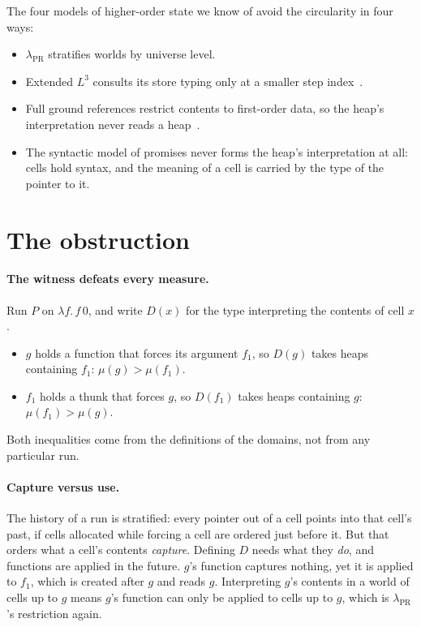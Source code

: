 \documentclass[11pt]{article}
\theoremstyle{remark}
\newcommand{\lpr}{\lambda_{\mathrm{PR}}}
\newcommand{\slam}[1]{\lambda #1.\,}
\begin{document}
The four models of higher-order state we know of avoid the circularity in
four ways:
\begin{itemize}
  \item $\lpr$ stratifies worlds by universe level.
  \item Extended $L^3$ consults its store typing only at a smaller
    step index~\cite{ahmed2007}.
  \item Full ground references restrict contents to first-order data, so
    the heap's interpretation never reads a heap~\cite{kammar2017}.
  \item The syntactic model of promises never forms the heap's
    interpretation at all: cells hold syntax, and the meaning of a cell is
    carried by the type of the pointer to it.
\end{itemize}

\section{The obstruction}
\label{sec:obstruction}

\paragraph{The witness defeats every measure.}
Run $P$ on $\slam{f} f\,0$, and write $D(x)$ for the type interpreting the
contents of cell $x$.
\begin{itemize}
  \item $g$ holds a function that forces its argument $f_1$, so $D(g)$ takes
    heaps containing $f_1$: $\mu(g) > \mu(f_1)$.
  \item $f_1$ holds a thunk that forces $g$, so $D(f_1)$ takes heaps
    containing $g$: $\mu(f_1) > \mu(g)$.
\end{itemize}
Both inequalities come from the definitions of the domains, not from any
particular run.

\paragraph{Capture versus use.}
The history of a run is stratified: every pointer out of a cell points into
that cell's past, if cells allocated while forcing a cell are ordered just
before it. But that orders what a cell's contents \emph{capture}. Defining
$D$ needs what they \emph{do}, and functions are applied in the future. $g$'s
function captures nothing, yet it is applied to $f_1$, which is created after
$g$ and reads $g$. Interpreting $g$'s contents in a world of cells up to $g$
means $g$'s function can only be applied to cells up to $g$, which is
$\lpr$'s restriction again.
\end{document}
